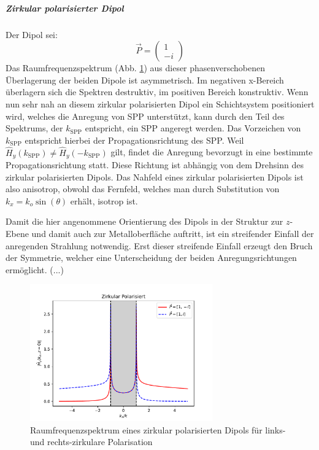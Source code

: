\documentclass[titlepage]{article}
\begin{document}
	\subparagraph{Zirkular polarisierter Dipol}
	Der Dipol sei:
	$$\vec{P} = \begin{pmatrix} 1 \\ -i\end{pmatrix}$$
	Das Raumfrequenzspektrum (Abb. \ref{fig:spatial_spectrum_circ}) aus dieser phasenverschobenen Überlagerung der beiden Dipole ist asymmetrisch.  Im negativen x-Bereich überlagern sich die Spektren destruktiv, im positiven Bereich konstruktiv. Wenn nun sehr nah an diesem zirkular polarisierten Dipol ein Schichtsystem positioniert wird, welches die Anregung von SPP unterstützt, kann durch den Teil des Spektrums, der $k_{\mathrm{SPP}}$ entspricht, ein SPP angeregt werden. Das Vorzeichen von $k_{\mathrm{SPP}}$ entspricht hierbei der Propagationsrichtung des SPP. Weil $\hat{H}_y(k_{\mathrm{SPP}}) \neq \hat{H}_y( -k_{\mathrm{SPP}}) $ gilt, findet die Anregung bevorzugt in eine bestimmte Propagationsrichtung statt. Diese Richtung ist abhängig von dem Drehsinn des zirkular polarisierten Dipols.			
	Das Nahfeld eines zirkular polarisierten Dipols ist also anisotrop, obwohl das Fernfeld, welches man durch Substitution von $k_x = k_o \sin(\theta)$ erhält, isotrop ist.
	
	Damit die hier angenommene Orientierung des Dipols in der Struktur zur $z$-Ebene und damit auch zur Metalloberfläche auftritt, ist ein streifender Einfall der anregenden Strahlung notwendig. Erst dieser streifende Einfall erzeugt den Bruch der Symmetrie, welcher eine Unterscheidung der beiden Anregungsrichtungen ermöglicht. (...)
	\begin{figure}[h]
		\centering
		\includegraphics[width=0.7\textwidth]{figures/spatial_spectrum_circ.pdf}
		\caption[Raumfrequenzspektrum zirkular polarisierter Dipol]{Raumfrequenzspektrum eines zirkular polarisierten Dipols für links- und rechts-zirkulare Polarisation}
		\label{fig:spatial_spectrum_circ}
	\end{figure}	
	
\end{document}
